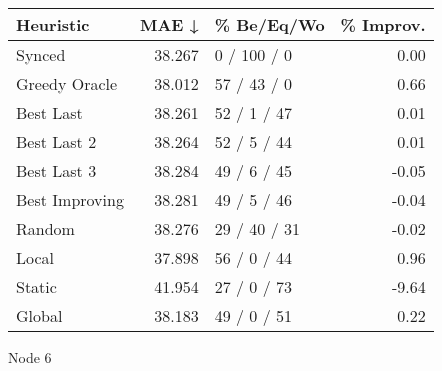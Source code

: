 \begin{tabular}{lrlr}
\toprule
\textbf{Heuristic} & \textbf{MAE ↓} & \textbf{\% Be/Eq/Wo} & \textbf{\% Improv.} \\
\midrule
            Synced &         38.267 &          0 / 100 / 0 &                0.00 \\
     Greedy Oracle &         38.012 &          57 / 43 / 0 &                0.66 \\
         Best Last &         38.261 &          52 / 1 / 47 &                0.01 \\
       Best Last 2 &         38.264 &          52 / 5 / 44 &                0.01 \\
       Best Last 3 &         38.284 &          49 / 6 / 45 &               -0.05 \\
    Best Improving &         38.281 &          49 / 5 / 46 &               -0.04 \\
            Random &         38.276 &         29 / 40 / 31 &               -0.02 \\
             Local &         37.898 &          56 / 0 / 44 &                0.96 \\
            Static &         41.954 &          27 / 0 / 73 &               -9.64 \\
            Global &         38.183 &          49 / 0 / 51 &                0.22 \\
\bottomrule
\end{tabular}
\caption{Node 6}
\label{tab:non_lr01_le1_bs2_6}

